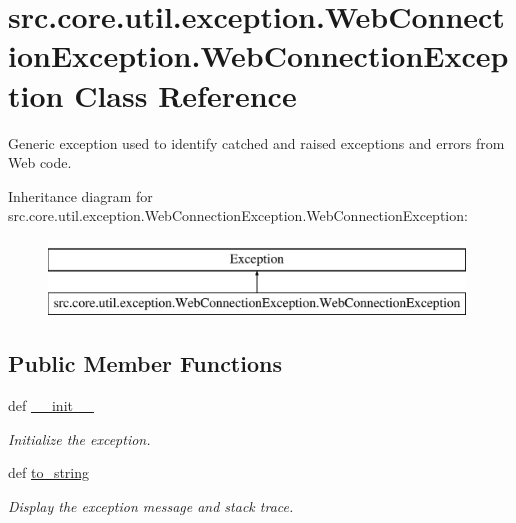 \hypertarget{classsrc_1_1core_1_1util_1_1exception_1_1WebConnectionException_1_1WebConnectionException}{\section{src.\-core.\-util.\-exception.\-Web\-Connection\-Exception.\-Web\-Connection\-Exception Class Reference}
\label{classsrc_1_1core_1_1util_1_1exception_1_1WebConnectionException_1_1WebConnectionException}
}


Generic exception used to identify catched and raised exceptions and errors from Web code.  


Inheritance diagram for src.\-core.\-util.\-exception.\-Web\-Connection\-Exception.\-Web\-Connection\-Exception\-:\begin{figure}[H]
\begin{center}
\leavevmode
\includegraphics[height=2.000000cm]{classsrc_1_1core_1_1util_1_1exception_1_1WebConnectionException_1_1WebConnectionException}
\end{center}
\end{figure}
\subsection*{Public Member Functions}
\begin{DoxyCompactItemize}
\item 
def \hyperlink{classsrc_1_1core_1_1util_1_1exception_1_1WebConnectionException_1_1WebConnectionException_a9b04dd4831fc016848e7c74f8e570d40}{\-\_\-\-\_\-init\-\_\-\-\_\-}
\begin{DoxyCompactList}\small\item\em Initialize the exception. \end{DoxyCompactList}\item 
\hypertarget{classsrc_1_1core_1_1util_1_1exception_1_1WebConnectionException_1_1WebConnectionException_aed505c87356f9b4b47efb0b75a884dce}{def \hyperlink{classsrc_1_1core_1_1util_1_1exception_1_1WebConnectionException_1_1WebConnectionException_aed505c87356f9b4b47efb0b75a884dce}{to\-\_\-string}}\label{classsrc_1_1core_1_1util_1_1exception_1_1WebConnectionException_1_1WebConnectionException_aed505c87356f9b4b47efb0b75a884dce}

\begin{DoxyCompactList}\small\item\em Display the exception message and stack trace. \end{DoxyCompactList}\end{DoxyCompactItemize}
